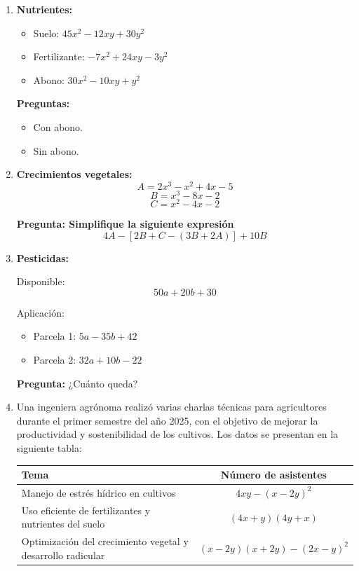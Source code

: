 \documentclass[12pt]{article}
\begin{document}
\begin{enumerate}
		\textbf{Pregunta:} ¿Cuál es la cantidad total aplicada?
		
			\item \textbf{Nutrientes:}
		\begin{itemize}
			\item Suelo: $45x^2 - 12xy + 30y^2$
			\item Fertilizante: $-7x^2 + 24xy - 3y^2$
			\item Abono: $30x^2 - 10xy + y^2$
		\end{itemize}
		
		\textbf{Preguntas:}
		\begin{itemize}
			\item Con abono.
			\item Sin abono.
		\end{itemize}
		
		\newpage
		
		\vspace*{1em}
		
		
		\item \textbf{Crecimientos vegetales:}
		\[
		A = 2x^3 - x^2 + 4x - 5
		\]
		\[
		B = x^3 - 8x - 2
		\]
		\[
		C = x^2 - 4x - 2
		\]
		
		\textbf{Pregunta: Simplifique la siguiente expresión}
		\[
		4A - [2B + C - (3B + 2A)] + 10B
		\]
		
		\item \textbf{Pesticidas:}
		
		Disponible:
		\[
		50a + 20b + 30
		\]
		
		Aplicación:
		\begin{itemize}
			\item Parcela 1: $5a - 35b + 42$
			\item Parcela 2: $32a + 10b - 22$
		\end{itemize}
		
		\textbf{Pregunta:} ¿Cuánto queda?
		
		\item Una ingeniera agrónoma realizó varias charlas técnicas para agricultores durante el primer semestre del año 2025, con el objetivo de mejorar la productividad y sostenibilidad de los cultivos. Los datos se presentan en la siguiente tabla:
		
		\begin{center}
			\begin{tabular}{|>{\raggedright\arraybackslash}p{9cm}|c|}
				\hline
				\textbf{Tema} & \textbf{Número de asistentes} \\
				\hline
				Manejo de estrés hídrico en cultivos & $4xy - (x - 2y)^2$ \\
				\hline
				Uso eficiente de fertilizantes y nutrientes del suelo & $(4x + y)(4y + x)$ \\
				\hline
				Optimización del crecimiento vegetal y desarrollo radicular & $(x - 2y)(x + 2y) - (2x - y)^2$ \\
				\hline
			\end{tabular}
		\end{center}
		

\end{enumerate}
\end{document}
